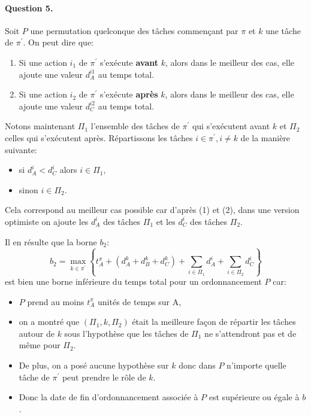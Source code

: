 \documentclass[a4paper, 10pt]{article}
\begin{document}
		\paragraph{Question 5.}{Soit $P$ une permutation quelconque des tâches commençant par $\pi$ et $k$ une tâche de $\pi^\prime$. On peut dire que:
		\begin{enumerate}
			\item Si une action $i_1$ de $\pi^\prime$ s'exécute \textbf{avant} $k$, alors dans le meilleur des cas, elle ajoute une valeur $d^{i1}_A$ au temps total. 
			\item Si une action $i_2$ de $\pi^\prime$  s'exécute \textbf{après} $k$, alors dans le meilleur des cas, elle ajoute une valeur $d^{i2}_C$ au temps total.
		\end{enumerate}
		
		Notons maintenant $\Pi_1$ l'ensemble des tâches de $\pi^\prime$ qui s'exécutent avant $k$ et $\Pi_2$ celles qui s'exécutent après. Répartissons les tâches $i \in \pi^\prime, i \ne k$ de la manière suivante:
		\begin{itemize}
			\item si $d^i_A < d^i_C$ alors $i \in \Pi_1$,
			\item sinon $i \in \Pi_2$.
		\end{itemize}
		Cela correspond au meilleur cas possible car d'après (1) et (2), dans une version optimiste on ajoute les $d^i_A$ des tâches $\Pi_1$ et les $d^i_C$ des tâches $\Pi_2$.
		
		Il en résulte que la borne $b_2$:
		\begin{equation*}
			b_2 = \max_{k \in \pi^\prime} \left\{ t^{\pi}_A + \left(d^k_A + d^k_B + d^k_C \right) + \sum_{i \in \Pi_1} d^i_A + \sum_{i \in \Pi_2} d^i_C \right\}
		\end{equation*}
		est bien une borne inférieure du temps total pour un ordonnancement $P$ car:
		\begin{itemize}
			\item $P$ prend au moins $t^\pi_A$ unités de temps sur A,
			\item on a montré que $\left(\Pi_1, k, \Pi_2\right)$ était la meilleure façon de répartir les tâches autour de $k$ sous l'hypothèse que les tâches de $\Pi_1$ ne s'attendront pas et de même pour $\Pi_2$.
			\item De plus, on a posé aucune hypothèse sur $k$ donc dans $P$ n'importe quelle tâche de $\pi^\prime$ peut prendre le rôle de $k$.
			\item Donc la date de fin d'ordonnancement associée à $P$ est supérieure ou égale à $b$.
		\end{itemize}
		}
		
\end{document}
